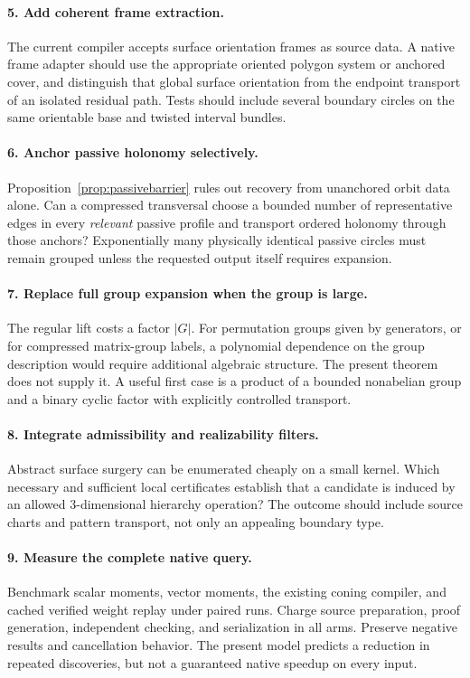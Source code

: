 \documentclass[11pt]{article}
\theoremstyle{definition}\newtheorem{definition}[theorem]{Definition}\newtheorem{example}[theorem]{Example}
\theoremstyle{remark}\newtheorem{remark}[theorem]{Remark}
\begin{document}
\paragraph{5. Add coherent frame extraction.}
The current compiler accepts surface orientation frames as source data. A native frame adapter should use the appropriate oriented polygon system or anchored cover, and distinguish that global surface orientation from the endpoint transport of an isolated residual path. Tests should include several boundary circles on the same orientable base and twisted interval bundles.

\paragraph{6. Anchor passive holonomy selectively.}
Proposition~\ref{prop:passivebarrier} rules out recovery from unanchored orbit data alone. Can a compressed transversal choose a bounded number of representative edges in every \emph{relevant} passive profile and transport ordered holonomy through those anchors? Exponentially many physically identical passive circles must remain grouped unless the requested output itself requires expansion.

\paragraph{7. Replace full group expansion when the group is large.}
The regular lift costs a factor $|G|$. For permutation groups given by generators, or for compressed matrix-group labels, a polynomial dependence on the group description would require additional algebraic structure. The present theorem does not supply it. A useful first case is a product of a bounded nonabelian group and a binary cyclic factor with explicitly controlled transport.

\paragraph{8. Integrate admissibility and realizability filters.}
Abstract surface surgery can be enumerated cheaply on a small kernel. Which necessary and sufficient local certificates establish that a candidate is induced by an allowed 3-dimensional hierarchy operation? The outcome should include source charts and pattern transport, not only an appealing boundary type.

\paragraph{9. Measure the complete native query.}
Benchmark scalar moments, vector moments, the existing coning compiler, and cached verified weight replay under paired runs. Charge source preparation, proof generation, independent checking, and serialization in all arms. Preserve negative results and cancellation behavior. The present model predicts a reduction in repeated discoveries, but not a guaranteed native speedup on every input.
\end{document}

